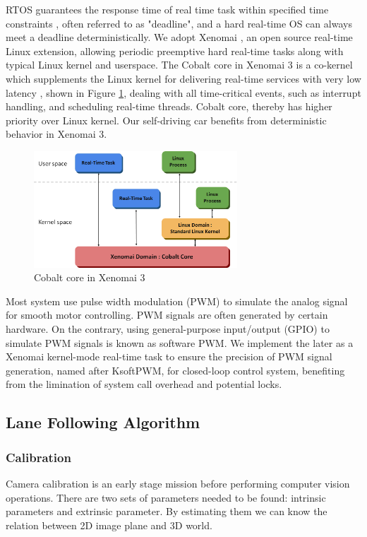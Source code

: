\documentclass[conference]{IEEEtran}
\begin{document}
RTOS guarantees the response time of real time task within specified time constraints \cite{RTOS}, often referred to as "deadline", and a hard real-time OS can always meet a deadline deterministically. We adopt Xenomai \cite{Xenomai}, an open source real-time Linux extension, allowing periodic preemptive hard real-time tasks along with typical Linux kernel and userspace. The Cobalt core in Xenomai 3 is a co-kernel which supplements the Linux kernel for delivering real-time services with very low latency \cite{rtlws2015}, shown in Figure \ref{fig:xeno_arch}, dealing with all time-critical events, such as interrupt handling, and scheduling real-time threads. Cobalt core, thereby has higher priority over Linux kernel. Our self-driving car benefits from deterministic behavior in Xenomai 3.

\begin{figure}
	\centering
	\includegraphics[width=3in]{img/xeno_arch.png}
	\caption{Cobalt core in Xenomai 3}
	\label{fig:xeno_arch}
\end{figure}

Most system use pulse width modulation (PWM) to simulate the analog signal for smooth motor controlling. PWM signals are often generated by certain hardware. On the contrary, using general-purpose input/output (GPIO) to simulate PWM signals is known as software PWM. We implement the later as a Xenomai kernel-mode real-time task to ensure the precision of PWM signal generation, named after KsoftPWM, for closed-loop control system, benefiting from the limination of system call overhead and potential locks.

\subsection{Lane Following Algorithm}

\subsubsection{Calibration}

Camera calibration is an early stage mission before performing computer vision operations. There are two sets of parameters needed to be found: intrinsic parameters and extrinsic parameter. By estimating them we can know the relation between 2D image plane and 3D world.
\end{document}
